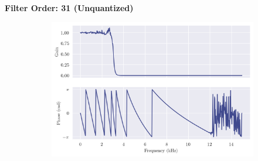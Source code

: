 \newpage
{\Large\textbf{Filter Order: 31 (Unquantized)}}
\vspace{1em}

\begin{figure}[ht]
    \centering
    \begin{subfigure}[b]{0.71\textwidth}
        \centering
        \includegraphics[width=\textwidth]{images/q8_31th_freqz.png}
    \end{subfigure}
    \hfill
    \begin{subfigure}[b]{0.25\textwidth}
        \centering

\end{subfigure}
\end{figure}
